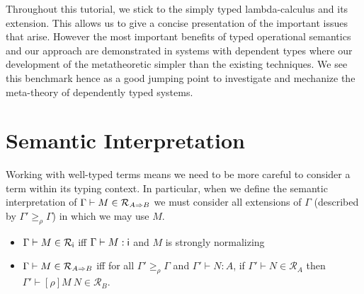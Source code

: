 \documentclass{article}
\newcommand{\ext}[1]{\geq_{#1}}
\newcommand{\SN}{\mathsf{SN}}
\newcommand{\denot}[1]{\mathcal{R}_{#1}}
\newcommand{\inden}[3]{#1 \vdash #2 \in \denot{#3}}
\def\lv{\mathopen{{[\kern-0.14em[}}}    %
\def\rv{\mathclose{{]\kern-0.14em]}}}   %
\newcommand{\den}[1]{\lv #1 \rv}
\begin{document}
Throughout this tutorial, we stick to the simply typed lambda-calculus and its extension. This allows us to give a concise presentation of the important issues that arise.  However the most important benefits of typed operational semantics and our approach are demonstrated in systems with dependent types  where our development of the metatheoretic simpler than the existing techniques. We see this benchmark hence as a good jumping point to investigate and mechanize the meta-theory of dependently typed systems.



\section{Semantic Interpretation}
Working with well-typed terms means we need to be more careful to
consider a term within its typing context. In particular, when we
define the semantic interpretation of $\inden{\Gamma}{M}{A \arrow B}$
we must consider all extensions of $\Gamma$ (described by $\Gamma'
\ext \rho \Gamma$) in which we may use $M$.

\begin{itemize}
\item $\inden{\Gamma}{M}{\base}$ iff $\Gamma \vdash M\mathrel{:} \textsf{i}$ and $M$ is strongly normalizing
\item $\inden{\Gamma}{M}{A \arrow B}$ iff for all $\Gamma' \ext{\rho} \Gamma$ and $\Gamma' \vdash N :A$, if $\inden{\Gamma'}{N}{A}$ then $\inden{\Gamma'}{[\rho]M~N}{B}$.
\end{itemize}





\end{document}
